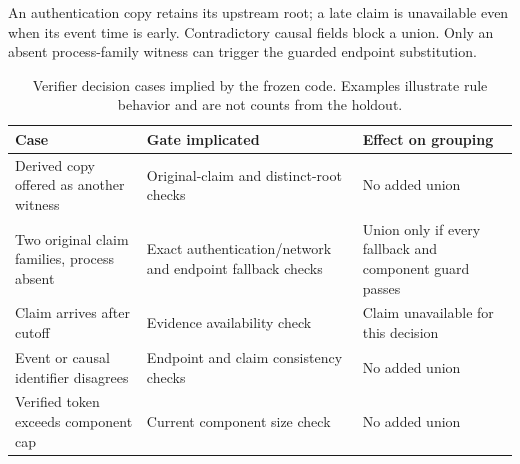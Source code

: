 An authentication copy retains its upstream root; a late claim is unavailable even when its event time is early. Contradictory causal fields block a union. Only an absent process-family witness can trigger the guarded endpoint substitution.
\begin{table}[t]\centering\footnotesize\caption{Verifier decision cases implied by the frozen code. Examples illustrate rule behavior and are not counts from the holdout.}\label{tab:decisions}\begin{tabularx}{\textwidth}{@{}p{}Yp{0.24\textwidth}@{}}\toprule Case & Gate implicated & Effect on grouping\\\midrule Derived copy offered as another witness & Original-claim and distinct-root checks & No added union\\ Two original claim families, process absent & Exact authentication/network and endpoint fallback checks & Union only if every fallback and component guard passes\\ Claim arrives after cutoff & Evidence availability check & Claim unavailable for this decision\\ Event or causal identifier disagrees & Endpoint and claim consistency checks & No added union\\ Verified token exceeds component cap & Current component size check & No added union\\\bottomrule\end{tabularx}\end{table}

